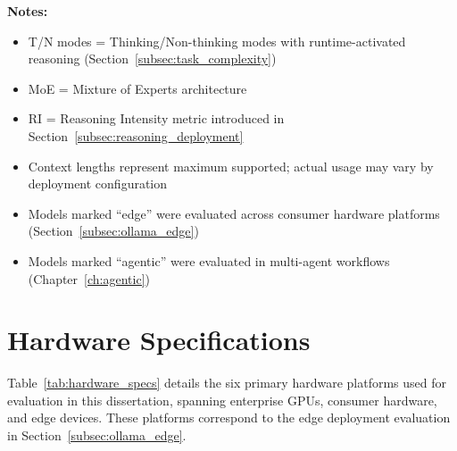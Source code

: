 \textbf{Notes:} 
\begin{itemize}[leftmargin=*]
    \item T/N modes = Thinking/Non-thinking modes with runtime-activated reasoning (Section~\ref{subsec:task_complexity})
    \item MoE = Mixture of Experts architecture
    \item RI = Reasoning Intensity metric introduced in Section~\ref{subsec:reasoning_deployment}
    \item Context lengths represent maximum supported; actual usage may vary by deployment configuration
    \item Models marked ``edge'' were evaluated across consumer hardware platforms (Section~\ref{subsec:ollama_edge})
    \item Models marked ``agentic'' were evaluated in multi-agent workflows (Chapter~\ref{ch:agentic})
\end{itemize}

\section{Hardware Specifications}
\label{app:hardware}

Table~\ref{tab:hardware_specs} details the six primary hardware platforms used for evaluation in this dissertation, spanning enterprise GPUs, consumer hardware, and edge devices. These platforms correspond to the edge deployment evaluation in Section~\ref{subsec:ollama_edge}.

